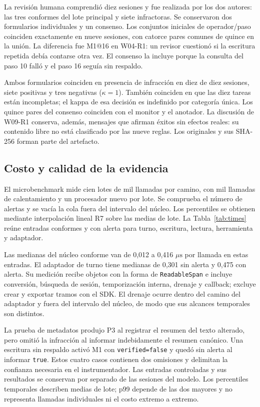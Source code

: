 \documentclass[conference]{IEEEtran}
\begin{document}
La revisión humana comprendió diez sesiones y fue realizada por los dos autores: las tres conformes del lote principal y siete infractoras. Se conservaron dos formularios individuales y un consenso. Los conjuntos iniciales de operador/paso coinciden exactamente en nueve sesiones, con catorce pares comunes de quince en la unión. La diferencia fue M1@16 en W04-R1: un revisor cuestionó si la escritura repetida debía contarse otra vez. El consenso la incluye porque la consulta del paso 10 falló y el paso 16 seguía sin respaldo.

Ambos formularios coinciden en presencia de infracción en diez de diez sesiones, siete positivas y tres negativas (\(\kappa=1\)). También coinciden en que las diez tareas están incompletas; el kappa de esa decisión es indefinido por categoría única. Los quince pares del consenso coinciden con el monitor y el anotador. La discusión de W09-R1 conserva, además, mensajes que afirman éxitos sin efectos reales: su contenido libre no está clasificado por las nueve reglas. Los originales y sus SHA-256 forman parte del artefacto.

\subsection{Costo y calidad de la evidencia}
El microbenchmark mide cien lotes de mil llamadas por camino, con mil llamadas de calentamiento y un procesador nuevo por lote. Se comprueba el número de alertas y se vacía la cola fuera del intervalo del núcleo. Los percentiles se obtienen mediante interpolación lineal R7 sobre las medias de lote. La Tabla~\ref{tab:times} reúne entradas conformes y con alerta para turno, escritura, lectura, herramienta y adaptador.


Las medianas del núcleo conforme van de 0,012 a 0,416 \(\mu\mathrm{s}\) por llamada en estas entradas. El adaptador de turno tiene medianas de 0,301 sin alerta y 0,475 con alerta. Su medición recibe objetos con la forma de \texttt{ReadableSpan} e incluye conversión, búsqueda de sesión, temporización interna, drenaje y callback; excluye crear y exportar tramos con el SDK. El drenaje ocurre dentro del camino del adaptador y fuera del intervalo del núcleo, de modo que sus alcances temporales son distintos.

La prueba de metadatos produjo P3 al registrar el resumen del texto alterado, pero omitió la infracción al informar indebidamente el resumen canónico. Una escritura sin respaldo activó M1 con \texttt{verified=false} y quedó sin alerta al informar \texttt{true}. Estos cuatro casos contienen dos omisiones y delimitan la confianza necesaria en el instrumentador. Las entradas controladas y sus resultados se conservan por separado de las sesiones del modelo. Los percentiles temporales describen medias de lote; p99 depende de las dos mayores y no representa llamadas individuales ni el costo extremo a extremo.
\end{document}

